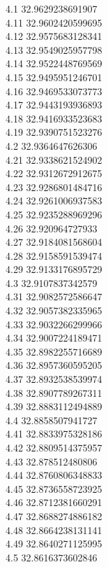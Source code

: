 {4.1	32.9629238691907\\
4.11	32.9602420599695\\
4.12	32.9575683128341\\
4.13	32.9549025957798\\
4.14	32.9522448769569\\
4.15	32.9495951246701\\
4.16	32.9469533073773\\
4.17	32.9443193936893\\
4.18	32.9416933523683\\
4.19	32.9390751523276\\
4.2	32.9364647626306\\
4.21	32.9338621524902\\
4.22	32.9312672912675\\
4.23	32.9286801484716\\
4.24	32.9261006937583\\
4.25	32.9235288969296\\
4.26	32.920964727933\\
4.27	32.9184081568604\\
4.28	32.9158591539474\\
4.29	32.9133176895729\\
4.3	32.9107837342579\\
4.31	32.9082572586647\\
4.32	32.9057382335965\\
4.33	32.9032266299966\\
4.34	32.9007224189471\\
4.35	32.8982255716689\\
4.36	32.8957360595205\\
4.37	32.8932538539974\\
4.38	32.8907789267311\\
4.39	32.8883112494889\\
4.4	32.8858507941727\\
4.41	32.8833975328186\\
4.42	32.8809514375957\\
4.43	32.878512480806\\
4.44	32.8760806348833\\
4.45	32.8736558723925\\
4.46	32.8712381660291\\
4.47	32.8688274886182\\
4.48	32.8664238131141\\
4.49	32.8640271125995\\
4.5	32.8616373602846\\
}

